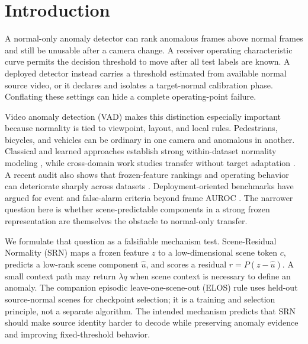 \section{Introduction}

A normal-only anomaly detector can rank anomalous frames above normal frames and still be unusable after a camera change. A receiver operating characteristic curve permits the decision threshold to move after all test labels are known. A deployed detector instead carries a threshold estimated from available normal source video, or it declares and isolates a target-normal calibration phase. Conflating these settings can hide a complete operating-point failure.

Video anomaly detection (VAD) makes this distinction especially important because normality is tied to viewpoint, layout, and local rules. Pedestrians, bicycles, and vehicles can be ordinary in one camera and anomalous in another. Classical and learned approaches establish strong within-dataset normality modeling \citep{li2014anomaly,liu2018future,gong2019memorizing,park2020memory}, while cross-domain work studies transfer without target adaptation \citep{aich2023crossdomain}. A recent audit also shows that frozen-feature rankings and operating behavior can deteriorate sharply across datasets \citep{rashidi2026benchmark}. Deployment-oriented benchmarks have argued for event and false-alarm criteria beyond frame AUROC \citep{ramachandra2020street}. The narrower question here is whether scene-predictable components in a strong frozen representation are themselves the obstacle to normal-only transfer.

We formulate that question as a falsifiable mechanism test. Scene-Residual Normality (SRN) maps a frozen feature $z$ to a low-dimensional scene token $c$, predicts a low-rank scene component $\hat u$, and scores a residual $r=P(z-\hat u)$. A small context path may return $\lambda q$ when scene context is necessary to define an anomaly. The companion episodic leave-one-scene-out (ELOS) rule uses held-out source-normal scenes for checkpoint selection; it is a training and selection principle, not a separate algorithm. The intended mechanism predicts that SRN should make source identity harder to decode while preserving anomaly evidence and improving fixed-threshold behavior.


